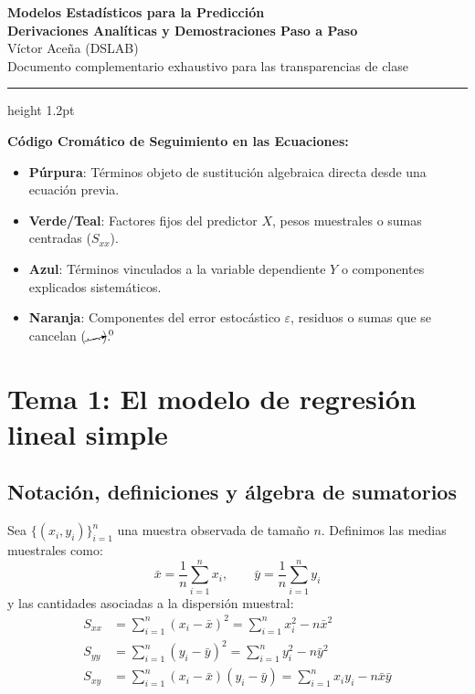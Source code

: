 \documentclass[11pt,a4paper]{article}
\begin{document}
\begin{center}
    {\Huge\textbf{\color{brandblue}Modelos Estadísticos para la Predicción}}\\[0.4em]
    {\LARGE\textbf{Derivaciones Analíticas y Demostraciones Paso a Paso}}\\[0.8em]
    {\large Víctor Aceña (DSLAB)}\\[0.3em]
    {\small Documento complementario exhaustivo para las transparencias de clase}
\end{center}
\vspace{0.3cm}
\hrule height 1.2pt
\vspace{0.4cm}

\begin{legendbox}
\textbf{\small Código Cromático de Seguimiento en las Ecuaciones:}
\begin{itemize}[leftmargin=1.5em, itemsep=0.1em]
    \item \textbf{\color{brandpurple}Púrpura}: Términos objeto de sustitución algebraica directa desde una ecuación previa.
    \item \textbf{\color{brandteal}Verde/Teal}: Factores fijos del predictor $X$, pesos muestrales o sumas centradas ($S_{xx}$).
    \item \textbf{\color{brandblue}Azul}: Términos vinculados a la variable dependiente $Y$ o componentes explicados sistemáticos.
    \item \textbf{\color{brandorange}Naranja}: Componentes del error estocástico $\varepsilon$, residuos o sumas que se cancelan ($\cancelto{0}{\dots}$).
\end{itemize}
\end{legendbox}

\tableofcontents




\newpage
\section{Tema 1: El modelo de regresión lineal simple}

\subsection{Notación, definiciones y álgebra de sumatorios}

Sea $\{(x_i, y_i)\}_{i=1}^n$ una muestra observada de tamaño $n$. Definimos las medias muestrales como:
\begin{equation}
\bar{x} = \frac{1}{n}\sum_{i=1}^n x_i, \qquad \bar{y} = \frac{1}{n}\sum_{i=1}^n y_i
\end{equation}
y las cantidades asociadas a la dispersión muestral:
\begin{align}
S_{xx} &= \sum_{i=1}^n (x_i - \bar{x})^2 = \sum_{i=1}^n x_i^2 - n\bar{x}^2 \\
S_{yy} &= \sum_{i=1}^n (y_i - \bar{y})^2 = \sum_{i=1}^n y_i^2 - n\bar{y}^2 \\
S_{xy} &= \sum_{i=1}^n (x_i - \bar{x})(y_i - \bar{y}) = \sum_{i=1}^n x_i y_i - n\bar{x}\bar{y}
\end{align}
\end{document}
